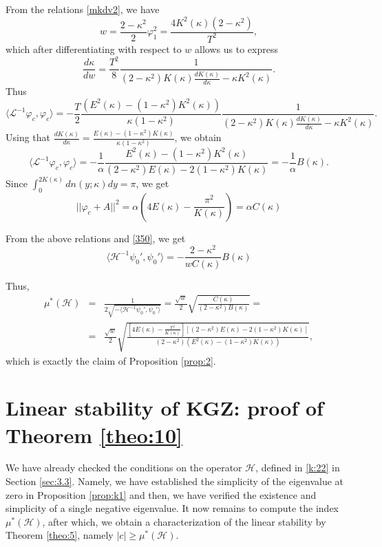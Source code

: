 \documentclass[final,11pt,leqno]{amsart}
\begin{document}
     From the relations \eqref{mkdv2}, we have
       $$
       w=\frac{2-\kappa^2}{2}\varphi_1^2=\frac{4 K^2({\kappa})(2-\kappa^2)}{T^2},
       $$
       which after differentiating with respect to $w$ allows us to express
       $$
       {\frac{d\kappa}{dw}}={\frac{T^2}{8}}{\frac{1}{(2-\kappa^2)K(\kappa){\frac{dK(\kappa)}{d\kappa}}-\kappa
       K^2(\kappa)}}.
       $$
       Thus
         $$
         {\langle {\mathcal{L}^{-1}\varphi_c},{\varphi_c} \rangle}
         =-\frac{T}{2}\frac{(E^2(\kappa)-(1-\kappa^2)K^2(\kappa))}{\kappa
       (1-\kappa^2)} \frac{1}{(2-\kappa^2)K(\kappa){\frac{dK(\kappa)}{d\kappa}}-\kappa
       K^2(\kappa)}.
       $$
       Using that
       ${\frac{dK(\kappa)}{d\kappa}}={\frac{E(\kappa)-(1-\kappa^2)K(\kappa)}{\kappa(1-\kappa^2)}}$,
       we obtain
         \begin{equation}\label{mkdv7}
         \langle \mathcal{L}^{-1}\varphi_c,
         \varphi_c\rangle=-{\frac{1}{\alpha}}{\frac{E^2(\kappa)-(1-\kappa^2)K^2(\kappa)}{(2-\kappa^2)E(\kappa)-2(1-\kappa^2)K(\kappa)}}=-{\frac{1}{\alpha}}B(\kappa).
         \end{equation}
       Since  $\int_{0}^{2K(\kappa)}{dn(y;\kappa)}dy=\pi$, we
       get
       \begin{equation}\label{mkdv8}
         ||\varphi_c+A||^2=\alpha \left(
         4E(\kappa)-{\frac{\pi^2}{K(\kappa)}}\right)=\alpha
         C(\kappa)
         \end{equation}

         From the above relations and \eqref{350}, we get
         \begin{equation}\label{mkdv10}
           \langle {\mathcal H}^{-1}\psi_0',
           \psi_0'\rangle=-{\frac{2-\kappa^2}{wC(\kappa)}}
           B(\kappa)
         \end{equation}

Thus,
\begin{eqnarray*}
\mu^*({\mathcal H}) &=& {\frac{{1}}{{2\sqrt{-{\langle { {\mathcal H}^{-1}\psi_0'},{\psi_0'} \rangle}}}}}=
{\frac{{\sqrt{w}}}{{2}}} \sqrt{{\frac{{C({\kappa})}}{{(2-{\kappa}^2)B({\kappa})}}}}= \\
&=& {\frac{{\sqrt{w}}}{{2}}}\sqrt{{\frac{{\left[4E({\kappa})-{\frac{{\pi^2}}{{K({\kappa})}}}\right][(2-{\kappa}^2) E({\kappa})-2(1-{\kappa}^2)K({\kappa})]}}{{(2-{\kappa}^2)(E^2({\kappa})-(1-{\kappa}^2) K({\kappa}))}}}},
\end{eqnarray*}
which  is exactly the claim of Proposition \ref{prop:2}.

\section{Linear stability of KGZ: proof of Theorem \ref{theo:10}}
\label{sec:5}
We have already checked the conditions on the operator ${\mathcal H}$, defined in \eqref{k:22} in Section \ref{sec:3.3}. Namely, we have established the simplicity of the eigenvalue at zero in Proposition \ref{prop:k1} and then, we have verified the existence and simplicity of a single negative eigenvalue.  It now remains to compute the index $\mu^*({\mathcal H})$,
after which, we obtain a characterization of the linear stability by Theorem \ref{theo:5}, namely $|c|\geq \mu^*({\mathcal H})$.
\end{document}
